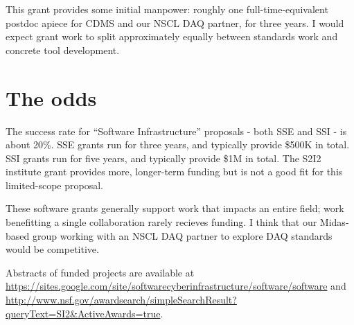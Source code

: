 \documentclass[]{report}   %
\begin{document}
This grant provides some initial manpower: roughly one full-time-equivalent postdoc apiece for CDMS and our NSCL DAQ partner, for three years.  I would expect grant work to split approximately equally between standards work and concrete tool development.





\section*{The odds}     %
The success rate for ``Software Infrastructure'' proposals - both SSE and SSI - is about 20\%. SSE grants run for three years, and typically
provide \$500K in total. SSI grants run for five years, and typically provide \$1M
in total.  The S2I2 institute grant provides more, longer-term funding but is not a good fit for this limited-scope proposal.
 
These software grants generally support work that impacts
an entire field; work benefitting a single collaboration rarely recieves
funding. %
I think that our Midas-based group working with an NSCL DAQ partner to explore DAQ standards would be competitive.

Abstracts of funded projects are available at
\url{https://sites.google.com/site/softwarecyberinfrastructure/software/software} and
\url{http://www.nsf.gov/awardsearch/simpleSearchResult?queryText=SI2&ActiveAwards=true}.
 
\end{document}
